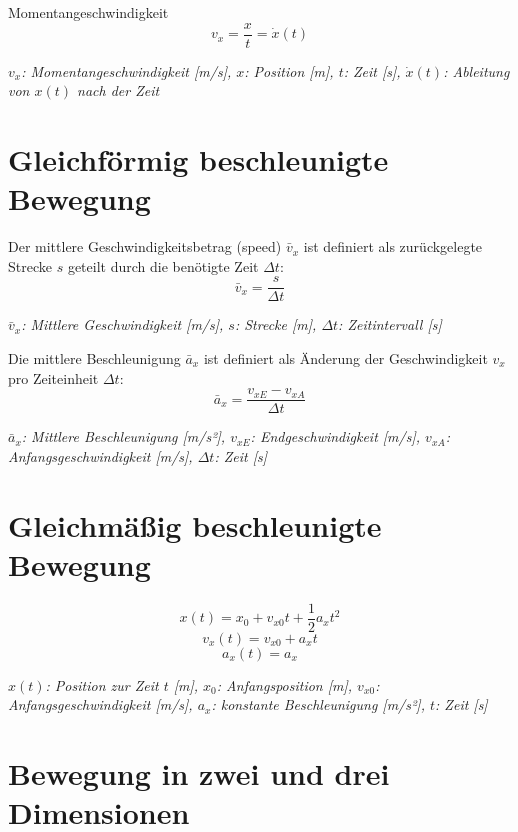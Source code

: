 \documentclass[a4paper,10pt]{article}
\newenvironment{displayformula}
{
	\begin{framed}
		\color{formulaColor}
	}
	{\end{framed}}
\newcommand{\formulalegend}[1]{%
	\par\vspace{0.5ex}%
	{{\color{legendColor}\RaggedRight\small\textit{#1}}}%
	\par\vspace{1.5ex}%
}
\begin{document}
\begin{displayformula}
	Momentangeschwindigkeit
	\[
	v_x = \dfrac{x}{t} = \dot{x} (t)
	\]
\end{displayformula}
\formulalegend{
	\( v_x \): Momentangeschwindigkeit [m/s], \( x \): Position [m], \( t \): Zeit [s], \( \dot{x}(t) \): Ableitung von \( x(t) \) nach der Zeit
}



\section{Gleichförmig beschleunigte Bewegung}

\begin{displayformula}
	Der mittlere Geschwindigkeitsbetrag (speed) \( \bar{v}_x \) ist definiert als zurückgelegte Strecke \( s \) geteilt durch die benötigte Zeit \( \Delta t \):
	\[
	\bar{v}_x = \frac{s}{\Delta t}
	\]
\end{displayformula}
\formulalegend{
	\( \bar{v}_x \): Mittlere Geschwindigkeit [m/s], \( s \): Strecke [m], \( \Delta t \): Zeitintervall [s]
}

\begin{displayformula}
	Die mittlere Beschleunigung \( \bar{a}_x \) ist definiert als Änderung der Geschwindigkeit \( v_x \) pro Zeiteinheit \( \Delta t \):
	\[
	\bar{a}_x = \frac{v_{xE} - v_{xA}}{\Delta t}
	\]
\end{displayformula}
\formulalegend{
	\( \bar{a}_x \): Mittlere Beschleunigung [m/s²], \( v_{xE} \): Endgeschwindigkeit [m/s], \( v_{xA} \): Anfangsgeschwindigkeit [m/s], \( \Delta t \): Zeit [s]
}



\section{Gleichmäßig beschleunigte Bewegung}

\begin{displayformula}
	\[
	x(t) = x_0 + v_{x0}t + \frac{1}{2} a_x t^2 
	\]
	\[
	v_x(t) = v_{x0} + a_x t
	\]
	\[
	a_x(t) = a_x
	\]
\end{displayformula}
\formulalegend{
	\( x(t) \): Position zur Zeit \( t \) [m], \( x_0 \): Anfangsposition [m], \( v_{x0} \): Anfangsgeschwindigkeit [m/s], \( a_x \): konstante Beschleunigung [m/s²], \( t \): Zeit [s]
}

\section{Bewegung in zwei und drei Dimensionen}
\end{document}
